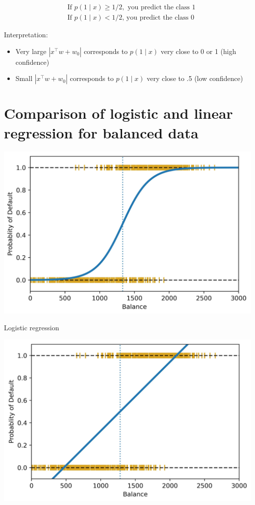 \documentclass[10pt]{article}
\begin{document}
$$
\begin{aligned}
& \text { If } p(1 \mid x) \geq 1 / 2, \text { you predict the class } 1 \\
& \text { If } p(1 \mid x)<1 / 2 \text {, you predict the class } 0
\end{aligned}
$$

Interpretation:

\begin{itemize}
  \item Very large $\left|x^{\top} w+w_{0}\right|$ corresponds to $p(1 \mid x)$ very close to 0 or 1 (high confidence)
  \item Small $\left|x^{\top} w+w_{0}\right|$ corresponds to $p(1 \mid x)$ very close to .5 (low confidence)
\end{itemize}

\section*{Comparison of logistic and linear regression for balanced data}
\begin{center}
\includegraphics[max width=\textwidth]{2023_12_30_261a5c67f471a6c49904g-06(1)}
\end{center}

Logistic regression

\begin{center}
\includegraphics[max width=\textwidth]{2023_12_30_261a5c67f471a6c49904g-06}
\end{center}
\end{document}
